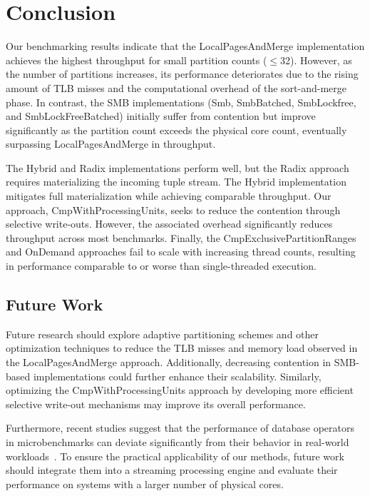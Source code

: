 
\chapter{Conclusion}\label{chapter:conclusion}\acresetall
Our benchmarking results indicate that the LocalPagesAndMerge implementation achieves the highest throughput for small partition counts ($\le$32).
However, as the number of partitions increases, its performance deteriorates due to the rising amount of \ac{TLB} misses and the computational overhead of the sort-and-merge phase.
In contrast, the \ac{SMB} implementations (Smb, SmbBatched, SmbLockfree, and SmbLockFreeBatched) initially suffer from contention but improve significantly as the partition count exceeds the physical core count, eventually surpassing LocalPagesAndMerge in throughput.

The Hybrid and Radix implementations perform well, but the Radix approach requires materializing the incoming tuple stream.
The Hybrid implementation mitigates full materialization while achieving comparable throughput.
Our approach, CmpWithProcessingUnits, seeks to reduce the contention through selective write-outs.
However, the associated overhead significantly reduces throughput across most benchmarks.
Finally, the CmpExclusivePartitionRanges and OnDemand approaches fail to scale with increasing thread counts, resulting in performance comparable to or worse than single-threaded execution.
\section{Future Work}
Future research should explore adaptive partitioning schemes and other optimization techniques to reduce the \ac{TLB} misses and memory load observed in the LocalPagesAndMerge approach.
Additionally, decreasing contention in SMB-based implementations could further enhance their scalability.
Similarly, optimizing the CmpWithProcessingUnits approach by developing more efficient selective write-out mechanisms may improve its overall performance.

Furthermore, recent studies suggest that the performance of database operators in microbenchmarks can deviate significantly from their behavior in real-world workloads~\parencite{joins-real-system, benchmark-fail-real-world}.
To ensure the practical applicability of our methods, future work should integrate them into a streaming processing engine and evaluate their performance on systems with a larger number of physical cores.
